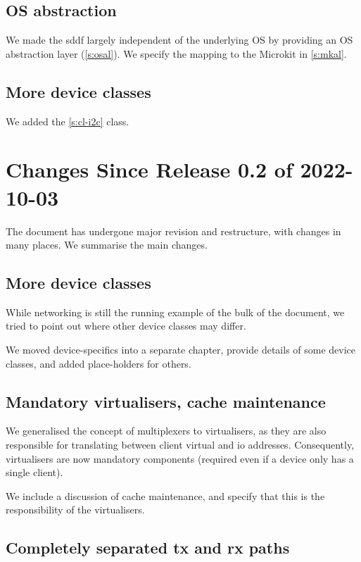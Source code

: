 \documentclass[a4paper,12pt]{report}
\begin{document}
\subsection{OS abstraction}

We made the \gls{sddf} largely independent of the underlying OS by
providing an OS abstraction layer (\autoref{s:osal}). We specify the
mapping to the Microkit in \autoref{s:mkal}.

\subsection{More device classes}

We added the \autoref{s:cl-i2c} class.

\section{Changes Since Release 0.2 of 2022-10-03}

The document has undergone major revision and restructure, with
changes in many places. We summarise the main changes.

\subsection{More device classes}

While networking is still the running example of the bulk of the
document, we tried to point out where other device classes may differ.

We moved device-specifics into a separate chapter, provide details
of some device classes, and added place-holders for others.

\subsection{Mandatory virtualisers, cache maintenance}

We generalised the concept of multiplexers to virtualisers, as they
are also responsible for translating between client virtual and \gls{io}
addresses. Consequently, virtualisers are now mandatory components
(required even if a device only has a single client).

We include a discussion of cache maintenance, and specify that this is
the responsibility of the virtualisers.

\subsection{Completely separated \gls{tx} and \gls{rx} paths}
\end{document}
